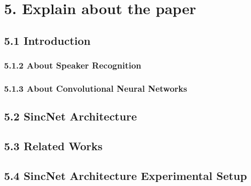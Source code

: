 \documentclass{article}
\begin{document}
	\section{5. Explain about the paper}
	\subsection{5.1 Introduction}
	
	\subsubsection{5.1.2 About Speaker Recognition}
	
	\subsubsection{5.1.3 About Convolutional Neural Networks}
	
	\subsection{5.2 SincNet Architecture}
	
	\subsection{5.3 Related Works}

	\subsection{5.4 SincNet Architecture Experimental Setup}
	\nocite{*}
	\newpage\cleardoublepage
	
\end{document}
